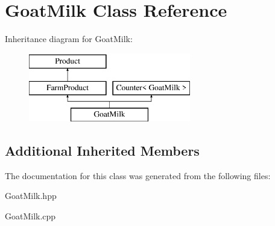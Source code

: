 \hypertarget{class_goat_milk}{}\section{Goat\+Milk Class Reference}
\label{class_goat_milk}
Inheritance diagram for Goat\+Milk\+:\begin{figure}[H]
\begin{center}
\leavevmode
\includegraphics[height=3.000000cm]{class_goat_milk}
\end{center}
\end{figure}
\subsection*{Additional Inherited Members}


The documentation for this class was generated from the following files\+:\begin{DoxyCompactItemize}
\item 
Goat\+Milk.\+hpp\item 
Goat\+Milk.\+cpp\end{DoxyCompactItemize}
